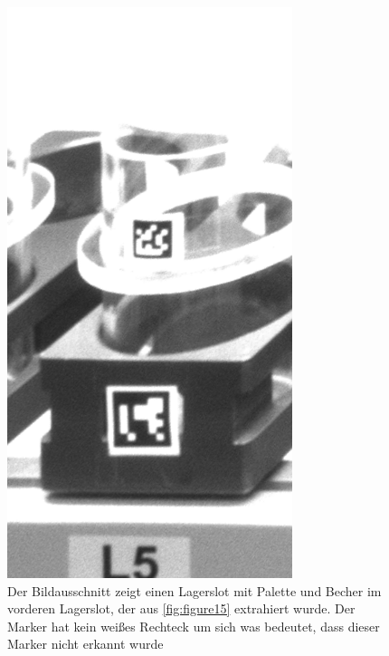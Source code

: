     \begin{figure}
        \caption[Bildzuschnitt einer Lagersektion und weitere Unterteilung in die Bereiche für Becher und Palette.]
        {\small Der Bildausschnitt zeigt einen Lagerslot mit Palette und Becher im vorderen Lagerslot, der aus \ref{fig:figure15} extrahiert wurde. Der Marker hat kein weißes Rechteck um sich was bedeutet, dass dieser Marker nicht erkannt wurde}\label{fig:figure18}
        \includegraphics[width = \textwidth/3]{Bilder/section_5.png}
        \centering
    \end{figure}


